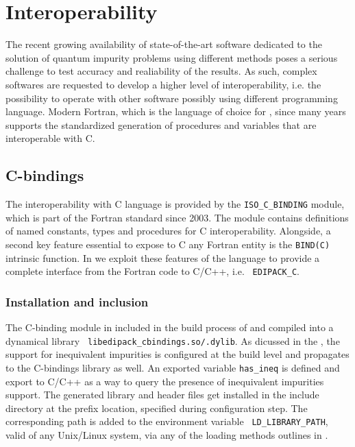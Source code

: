 \documentclass[edipack2.tex]{subfiles}
\begin{document}
\section{Interoperability}\label{SecInterop}
The recent growing availability of state-of-the-art software dedicated
to the solution of quantum impurity problems using different methods
poses a serious challenge to test accuracy and realiability of the
results.
As such, complex softwares are requested to develop a higher level of
interoperability, i.e. the possibility to operate with other software
possibly using different programming language.
Modern Fortran, which is the language of choice for \NAME, since many
years supports the standardized generation of procedures and
variables that are interoperable with C.


\subsection{C-bindings}\label{sSecInteropCbindings}
The interoperability with C language is provided by the
{\tt ISO\_C\_BINDING} module, which is part of the Fortran
standard since 2003. The module contains definitions of named
constants, types and procedures for C interoperability.
Alongside, a second key feature essential to expose to C any Fortran
entity is the {\tt BIND(C)} intrinsic function.
In \NAME we exploit these features of the language to provide a
complete interface from the Fortran code to C/C++, i.e. {\tt
  EDIPACK\_C}. 


\subsubsection{Installation and inclusion}\label{sSecInteropCbindingsInstallation}
The C-binding module in included in the build process of \NAME and
compiled into a dynamical library {\tt
  libedipack\_cbindings.so/.dylib}. As dicussed in the
, the support for inequivalent
impurities is configured at the build level and propagates to the
C-bindings library as well. An exported variable {\tt has\_ineq} is
defined and export to C/C++ as a way to query the presence of
inequivalent impurities support. 
The generated library and header files get installed in the include
directory at the prefix location, specified during configuration
step. The corresponding path is added to the environment variable {\tt
  LD\_LIBRARY\_PATH}, valid of any Unix/Linux system, via any of the
loading methods outlines in . 
\end{document}
